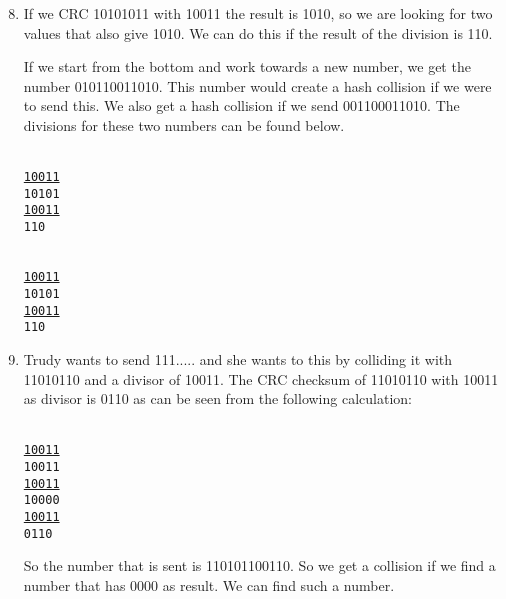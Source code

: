 \begin{enumerate}
\setcounter{enumi}{7}
\item If we CRC 10101011 with 10011 the result is 1010, so we are looking for two values that also give 1010. We can do this if the result of the division is 110.

If we start from the bottom and work towards a new number, we get the number 010110011010. This number would create a hash collision if we were to send this. We also get a hash collision if we send 001100011010. The divisions for these two numbers can be found below.

\begin{minipage}{0.5\textwidth}
\texttt{\\
\phantom{11}\underline{10011}\\
\phantom{111}10101\\
\phantom{111}\underline{10011}\\
\phantom{11111}110\\}
\end{minipage}
\begin{minipage}{0.5\textwidth}
\texttt{\\
\phantom{1}\underline{10011}\\
\phantom{111}10101\\
\phantom{111}\underline{10011}\\
\phantom{11111}110\\}
\end{minipage}

\item Trudy wants to send 111..... and she wants to this by colliding it with 11010110 and a divisor of 10011. The CRC checksum of 11010110 with 10011 as divisor is 0110 as can be seen from the following calculation:

\texttt{\\
\underline{10011}\\
\phantom{1}10011\\
\phantom{1}\underline{10011}\\
\phantom{111111}10000\\
\phantom{111111}\underline{10011}\\
\phantom{11111111}0110\\
}

So the number that is sent is 110101100110. So we get a collision if we find a number that has 0000 as result. We can find such a number. 


\end{enumerate}
